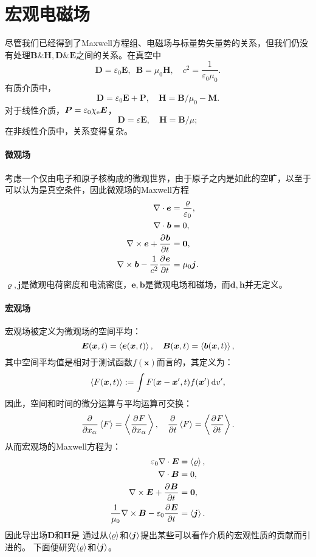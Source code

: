 \section{宏观电磁场}
尽管我们已经得到了Maxwell方程组、电磁场与标量势矢量势的关系，但我们仍没有处理$\bm B\&\bm H,\bm D\&\bm E$之间的关系。在真空中
\[
    \bm D=\varepsilon_0\bm E,\enspace\bm B=\mu_0\bm H,\quad c^2=\frac1{\varepsilon_0\mu_0}.
\]
有质介质中，
\[
    \bm D=\varepsilon_0\bm E+\bm P,\quad \bm H=\bm B/\mu_0-\bm M.
\]
对于线性介质，$\bm P=\varepsilon_0\chi_\mathrm e\bm E$，
\[
    \bm D=\varepsilon\bm E,\quad\bm H=\bm B/\mu;
\]
在非线性介质中，关系变得复杂。
\paragraph{微观场}
考虑一个仅由电子和原子核构成的微观世界，由于原子之内是如此的空旷，以至于可以认为是真空条件，因此微观场的Maxwell方程
\begin{align*}
    \nabla\cdot\bm e&=\frac\varrho{\varepsilon_0},\\
    \nabla\cdot\bm b&=0,\\
    \nabla\times\bm e+\frac{\partial^{{}}\bm b}{\partial{t}^{{}}}&=\bm 0,\\
    \nabla\times\bm b-\frac1{c^2}\frac{\partial^{{}}\bm e}{\partial{t}^{{}}}&=\mu_0\bm j.
\end{align*}
$\varrho,\bm j$是微观电荷密度和电流密度，$\bm e,\bm b$是微观电场和磁场，而$\bm d,\bm h$并无定义。
\paragraph{宏观场}
宏观场被定义为微观场的空间平均：
\[
    \bm E(\bm x,t)=\left\langle \bm e(\bm x,t)\right\rangle,\quad \bm B(\bm x,t)=\left\langle \bm b(\bm x,t)\right\rangle,
\]
其中空间平均值是相对于测试函数$f(\bm x)$而言的，其定义为：
\[
    \left\langle F(\bm x,t)\right\rangle:=\int F(\bm x-\bm x',t)f(\bm x')\mathop{}\!\mathrm{d} v',
\]
因此，空间和时间的微分运算与平均运算可交换：
\[
    \frac{\partial^{{}}}{\partial{x_\alpha}^{{}}}\left\langle F\right\rangle=\left\langle \frac{\partial^{{}}F}{\partial{x_\alpha}^{{}}}\right\rangle,\quad\frac{\partial^{{}}}{\partial{t}^{{}}}\left\langle F\right\rangle=\left\langle \frac{\partial^{{}}F}{\partial{t}^{{}}}\right\rangle.
\]
从而宏观场的Maxwell方程为： 
\begin{align}
    \label{eqn:average rho}
    \varepsilon_0\nabla\cdot\bm E&=\left\langle \varrho\right\rangle,\\
    \notag
    \nabla\cdot\bm B&=0,\\
    \notag
    \nabla\times\bm E+\frac{\partial^{{}}\bm B}{\partial{t}^{{}}}&=\bm0,\\
    \label{eqn:average j}
    \frac1{\mu_0}\nabla\times\bm B-\varepsilon_0\frac{\partial^{{}}\bm E}{\partial{t}^{{}}}&=\left\langle \bm j\right\rangle.
\end{align}
因此导出场$\bm D$和$\bm H$是
通过从$\left\langle \varrho\right\rangle$和$\left\langle \bm j\right\rangle$提出某些可以看作介质的宏观性质的贡献而引进的。
下面便研究$\left\langle \varrho\right\rangle$和$\left\langle \bm j\right\rangle$。
